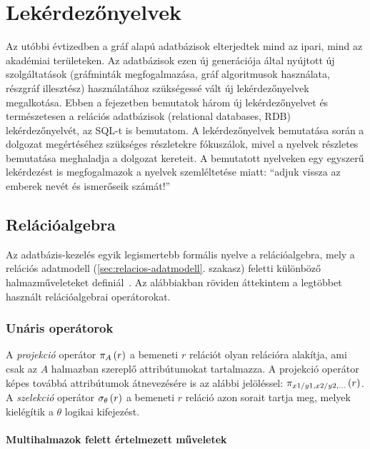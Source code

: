 \section{Lekérdezőnyelvek}
Az utóbbi évtizedben a gráf alapú adatbázisok elterjedtek mind az ipari, mind az akadémiai területeken. Az adatbázisok ezen új generációja által nyújtott új szolgáltatások (gráfminták megfogalmazása, gráf algoritmusok használata, részgráf illesztész) használatához szükségessé vált új lekérdezőnyelvek megalkotása. Ebben a fejezetben bemutatok három új lekérdezőnyelvet és természetesen a relációs adatbázisok (relational databases, RDB) lekérdezőnyelvét, az SQL-t is bemutatom. A lekérdezőnyelvek bemutatása során a dolgozat megértéséhez szükséges részletekre fókuszálok, mivel a nyelvek részletes bemutatása meghaladja a dolgozat kereteit. A bemutatott nyelveken egy egyszerű lekérdezést is megfogalmazok a nyelvek szemléltetése miatt: ``adjuk vissza az emberek nevét és ismerőseik számát!''




\subsection{Relációalgebra}
\label{sec:relacioalgebra}

Az adatbázis-kezelés egyik legismertebb formális nyelve a relációalgebra, mely a relációs adatmodell (\ref{sec:relacios-adatmodell}. szakasz) feletti különböző halmazműveleteket definiál~\cite{gajdos,DBLP:books/daglib/0020812,DBLP:books/daglib/0015084}. Az alábbiakban röviden áttekintem a legtöbbet használt relációalgebrai operátorokat.

\subsubsection{Unáris operátorok}
A \emph{projekció} operátor $ \pi_{A} \left(r\right)$ a bemeneti $r$ relációt olyan relációra alakítja, ami csak az $A$ halmazban szereplő attribútumokat tartalmazza. A projekció operátor képes továbbá attribútumok átnevezésére is az alábbi jelöléssel: $ \pi_{x1 / y1, x2 / y2, \ldots} \left(r\right)$.
A \emph{szelekció} operátor $ \sigma_{\theta} \left(r\right) $ a bemeneti $r$ reláció azon sorait tartja meg, melyek kielégítik a $\theta$ logikai kifejezést.

\paragraph{Multihalmazok felett értelmezett műveletek}

